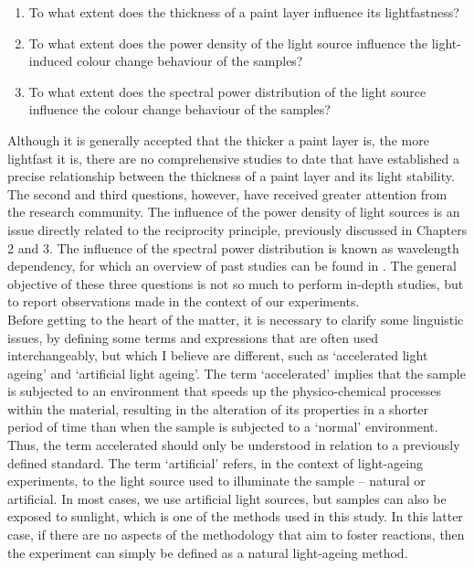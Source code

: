 \begin{enumerate}
\item To what extent does the thickness of a paint layer influence its lightfastness?
\item To what extent does the power density of the light source influence the light-induced colour change behaviour of the samples?
\item To what extent does the spectral power distribution of the light source influence the colour change behaviour of the samples?
\end{enumerate}

Although it is generally accepted that the thicker a paint layer is, the more lightfast it is, there are no comprehensive studies to date that have established a precise relationship between the thickness of a paint layer and its light stability. The second and third questions, however, have received greater attention from the research community. The influence of the power density of light sources is an issue directly related to the reciprocity principle, previously discussed in Chapters 2 and 3. The influence of the spectral power distribution is known as wavelength dependency, for which an overview of past studies can be found in \citet[109-16]{saunders_museum_2020}. The general objective of these three questions is not so much to perform in-depth studies, but to report observations made in the context of our experiments. \\

Before getting to the heart of the matter, it is necessary to clarify some linguistic issues, by defining some terms and expressions that are often used interchangeably, but which I believe are different, such as ‘accelerated light ageing’ and ‘artificial light ageing’. The term ‘accelerated’ implies that the sample is subjected to an environment that speeds up the physico-chemical processes within the material, resulting in the alteration of its properties in a shorter period of time than when the sample is subjected to a ‘normal’ environment. Thus, the term accelerated should only be understood in relation to a previously defined standard. The term ‘artificial’ refers, in the context of light-ageing experiments, to the light source used to illuminate the sample – natural or artificial. In most cases, we use artificial light sources, but samples can also be exposed to sunlight, which is one of the methods used in this study. In this latter case, if there are no aspects of the methodology that aim to foster reactions, then the experiment can simply be defined as a natural light-ageing method.


